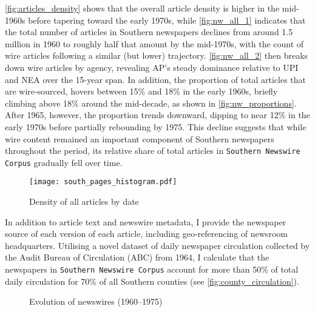 \documentclass{article}
\begin{document}
\autoref{fig:articles_density}  shows that the overall article density is higher in the mid-1960s before tapering toward the early 1970s, while \autoref{fig:nw_all_1} indicates that the total number of articles in Southern newspapers declines from around 1.5 million in 1960 to roughly half that amount by the mid-1970s, with the count of wire articles following a similar (but lower) trajectory. \autoref{fig:nw_all_2} then breaks down wire articles by agency, revealing AP’s steady dominance relative to UPI and NEA over the 15-year span. In addition, the proportion of total articles that are wire-sourced, hovers between 15\% and 18\% in the early 1960s, briefly climbing above 18\% around the mid-decade, as shown in \autoref{fig:nw_proportions}. After 1965, however, the proportion trends downward, dipping to near 12\% in the early 1970s before partially rebounding by 1975. This decline suggests that while wire content remained an important component of Southern newspapers throughout the period, its relative share of total articles in \texttt{Southern Newswire Corpus} gradually fell over time.

\begin{figure}[H]
\centering
\texttt{[image: south\_pages\_histogram.pdf]}
\caption{Density of all articles by date}
\label{fig:articles_density}
\end{figure}

In addition to article text and newswire metadata, I provide the newspaper source of each version of each article, including geo-referencing of newsroom headquarters. Utilising a novel dataset of daily newspaper circulation collected by the Audit Bureau of Circulation (ABC) from 1964, I calculate that the newspapers in \texttt{Southern Newswire Corpus} account for more than 50\% of total daily circulation for 70\% of all Southern counties (see \autoref{fig:county_circulation}). 

\begin{figure}[htbp]
  \centering
  \begin{minipage}[b]{0.4\textwidth}
    \centering
  \end{minipage}
  \hspace{2em}
  \begin{minipage}[b]{0.4\textwidth}
    \centering
  \end{minipage}
  \caption{Evolution of newswires (1960–1975)}
  \label{fig:nw_evolutions}  
\end{figure}
\end{document}
